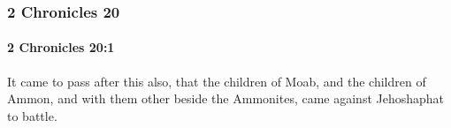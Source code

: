 	\subsubsection{2 Chronicles 20} %
		\label{2CHRONICLES-20}

		\paragraph{2 Chronicles 20:1} %
			\label{2CHRONICLES-20-1}

			It came to pass after this also, that the children of Moab, and the children of Ammon, and with them other beside the Ammonites, came against Jehoshaphat to battle.



